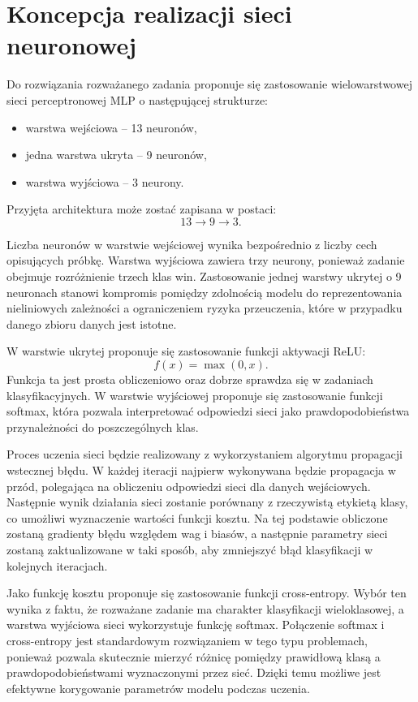 \section{Koncepcja realizacji sieci neuronowej}

Do rozwiązania rozważanego zadania proponuje się zastosowanie wielowarstwowej sieci perceptronowej MLP o następującej strukturze:
\begin{itemize}
    \item warstwa wejściowa -- 13 neuronów,
    \item jedna warstwa ukryta -- 9 neuronów,
    \item warstwa wyjściowa -- 3 neurony.
\end{itemize}

Przyjęta architektura może zostać zapisana w postaci:
\[
13 \rightarrow 9 \rightarrow 3.
\]

Liczba neuronów w warstwie wejściowej wynika bezpośrednio z liczby cech opisujących próbkę. Warstwa wyjściowa zawiera trzy neurony, ponieważ zadanie obejmuje rozróżnienie trzech klas win. Zastosowanie jednej warstwy ukrytej o 9 neuronach stanowi kompromis pomiędzy zdolnością modelu do reprezentowania nieliniowych zależności a ograniczeniem ryzyka przeuczenia, które w przypadku danego zbioru danych jest istotne.

W warstwie ukrytej proponuje się zastosowanie funkcji aktywacji ReLU:
\[
f(x) = \max(0, x).
\]
Funkcja ta jest prosta obliczeniowo oraz dobrze sprawdza się w zadaniach klasyfikacyjnych. W warstwie wyjściowej proponuje się zastosowanie funkcji softmax, która pozwala interpretować odpowiedzi sieci jako prawdopodobieństwa przynależności do poszczególnych klas.

Proces uczenia sieci będzie realizowany z wykorzystaniem algorytmu propagacji wstecznej błędu. W każdej iteracji najpierw wykonywana będzie propagacja w przód, polegająca na obliczeniu odpowiedzi sieci dla danych wejściowych. Następnie wynik działania sieci zostanie porównany z rzeczywistą etykietą klasy, co umożliwi wyznaczenie wartości funkcji kosztu. Na tej podstawie obliczone zostaną gradienty błędu względem wag i biasów, a następnie parametry sieci zostaną zaktualizowane w taki sposób, aby zmniejszyć błąd klasyfikacji w kolejnych iteracjach.

Jako funkcję kosztu proponuje się zastosowanie funkcji cross-entropy. Wybór ten wynika z faktu, że rozważane zadanie ma charakter klasyfikacji wieloklasowej, a warstwa wyjściowa sieci wykorzystuje funkcję softmax. Połączenie softmax i cross-entropy jest standardowym rozwiązaniem w tego typu problemach, ponieważ pozwala skutecznie mierzyć różnicę pomiędzy prawidłową klasą a prawdopodobieństwami wyznaczonymi przez sieć. Dzięki temu możliwe jest efektywne korygowanie parametrów modelu podczas uczenia.

